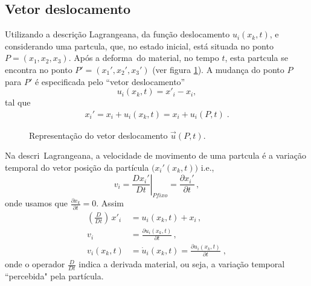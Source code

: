 \subsection{Vetor deslocamento}

Utilizando a descri\c{c}\~ao Lagrangeana, da 
fun\c{c}\~ao deslocamento $u_i(x_k,t)$, e considerando uma part\ih cula, que, no estado
inicial, est\'a situada no ponto $P=(x_1,x_2,x_3)$. Ap\'os a deforma\cao\
do material, no tempo $t$, esta part\ih cula se encontra
no ponto $P'=(x_1',x_2',x_3')$ (ver figura \ref{fig:vetor-deslocamento}).
A mudan\c{c}a do ponto $P$
para $P'$ \'e especificada pelo ``vetor deslocamento''
\begin{equation}
u_i(x_k , t)=x'_{i} - x_i ,
\end{equation}
tal que
\begin{eqnarray}
x_i' = x_i + u_i(x_k,t) = x_i + u_i(P,t) \; .
\end{eqnarray}

\begin{figure}[!tb]
\centering
{}
\caption{Representa\c{c}\~ao do vetor deslocamento $\vec{u}(P,t)$.}
\label{fig:vetor-deslocamento}
\end{figure}

Na descri\cao\ Lagrangeana, a velocidade de movimento de
uma part\ih cula \'e a varia\c{c}\~ao temporal do vetor posi\c{c}\~ao da
part\'icula $\bigl(x_i'(x_k,t)\bigr)$ i.e.,
\begin{equation}
  v_i=\left. \frac{Dx_i'}{Dt}\right|_{P fixo} = \frac{\partial x_i'}{\partial t} \, ,
\end{equation}
onde usamos que $\frac{\partial x_k}{\partial t}=0$.
Assim
\begin{align}
  \left(\frac{D}{Dt}\right)\,x'_i &= u_i(x_k,t) + x_i \, , \\
  v_i &= \frac{\partial u_i(x_k,t)}{\partial t}\, , \\
  v_i(x_k,t) &= \dot{u}_i(x_k,t) = \frac{\partial u_i(x_k,t)}
{\partial t} \; ,
\end{align}
onde o operador $\frac{D}{Dt}$ indica a derivada material, ou seja, a
varia\c{c}\~ao temporal ``percebida" \hspace{1pt} pela part\'icula.

